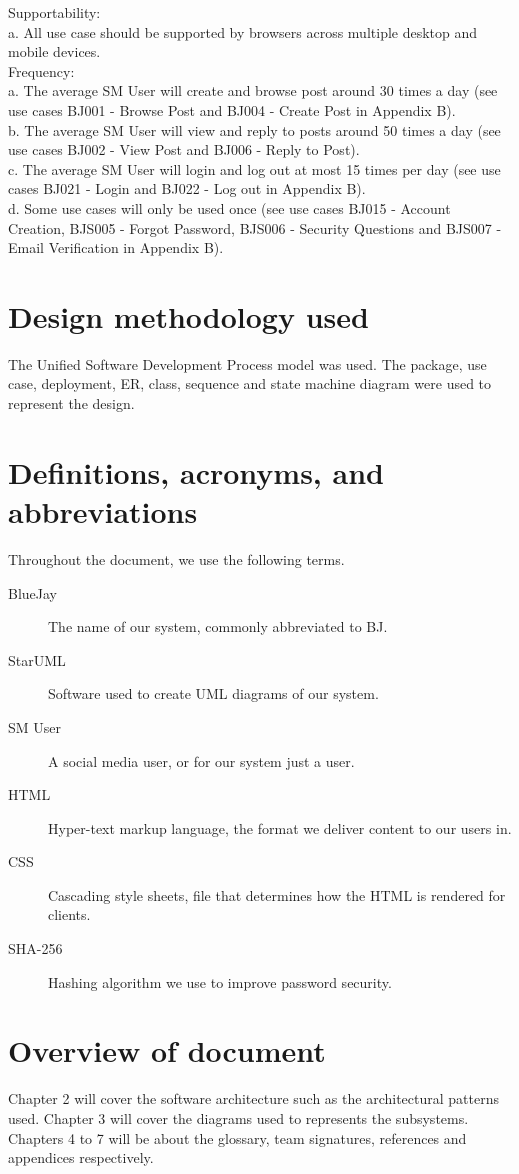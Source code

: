 \documentclass{report}
\begin{document}
	Supportability: \\
		a.	All use case should be supported by browsers across multiple desktop and mobile devices.\\
	Frequency:\\
		a.	The average SM User will create and browse post around 30 times a day (see use cases BJ001 - Browse Post and BJ004 - Create Post in Appendix B).\\
		b.	The average SM User will view and reply to posts around 50 times a day (see use cases BJ002 - View Post and BJ006 - Reply to Post).\\
		c.	The average SM User will login and log out at most 15 times per day (see use cases BJ021 - Login and BJ022 - Log out in Appendix B).\\
		d.	Some use cases will only be used once (see use cases BJ015 - Account Creation, BJS005 - Forgot Password, BJS006 - Security Questions and BJS007 - Email Verification in Appendix B).\\
\section{Design methodology used} 
	The Unified Software Development Process model was used.
	The package, use case, deployment, ER, class, sequence and state machine diagram were used to represent the design.


\section{Definitions, acronyms, and abbreviations}
	Throughout the document, we use the following terms.
	\begin{description}
		\item [BlueJay] The name of our system, commonly abbreviated to BJ.
		\item [StarUML] Software used to create UML diagrams of our system.
		\item [SM User] A social media user, or for our system just a user.
		\item [HTML] Hyper-text markup language, the format we deliver content to our users in.
		\item [CSS] Cascading style sheets, file that determines how the HTML is rendered for clients.
		\item [SHA-256] Hashing algorithm we use to improve password security.
	\end{description}
\section{Overview of document}
	Chapter 2 will cover the software architecture such as the architectural patterns used.
	Chapter 3 will cover the diagrams used to represents the subsystems.
	Chapters 4 to 7 will be about the glossary, team signatures, references and appendices respectively.
\end{document}
